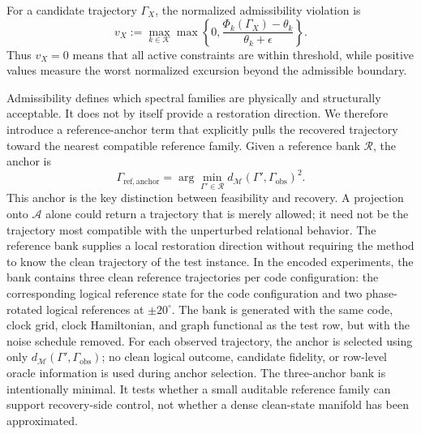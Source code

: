 \documentclass{iopjournal}
\begin{document}
For a candidate trajectory $\Gamma_X$, the normalized admissibility violation is
\begin{equation}
v_X
:=
\max_{k\in\mathcal{K}}
\max\left\{0,
\frac{\Phi_k(\Gamma_X)-\theta_k}{\theta_k+\epsilon}
\right\}.
\label{eq:normalized-violation-main}
\end{equation}
Thus $v_X=0$ means that all active constraints are within threshold, while
positive values measure the worst normalized excursion beyond the admissible
boundary.

Admissibility defines which spectral families are physically and structurally
acceptable. It does not by itself provide a restoration direction. We therefore
introduce a reference-anchor term that explicitly pulls the recovered trajectory
toward the nearest compatible reference family. Given a reference bank
$\mathcal{R}$, the anchor is
\begin{equation}
\Gamma_{\mathrm{ref,anchor}}
=
\arg\min_{\Gamma'\in\mathcal{R}}
d_{\mathcal{M}}\!\left(\Gamma',\Gamma_{\mathrm{obs}}\right)^2.
\end{equation}
This anchor is the key distinction between feasibility and recovery. A projection
onto $\mathcal{A}$ alone could return a trajectory that is merely allowed; it need
not be the trajectory most compatible with the unperturbed relational behavior.
The reference bank supplies a local restoration direction without requiring the
method to know the clean trajectory of the test instance. In the encoded
experiments, the bank contains three clean reference trajectories per code
configuration: the corresponding logical reference state for the code
configuration and two phase-rotated logical references at $\pm20^\circ$. The bank
is generated with the same code, clock grid, clock Hamiltonian, and graph
functional as the test row, but with the noise schedule removed. For each
observed trajectory, the anchor is selected using
only $d_{\mathcal M}(\Gamma',\Gamma_{\mathrm{obs}})$; no clean logical outcome,
candidate fidelity, or row-level oracle information is used during anchor
selection.
The three-anchor bank is intentionally minimal. It tests whether a small
auditable reference family can support recovery-side control, not whether a dense
clean-state manifold has been approximated.
\end{document}
